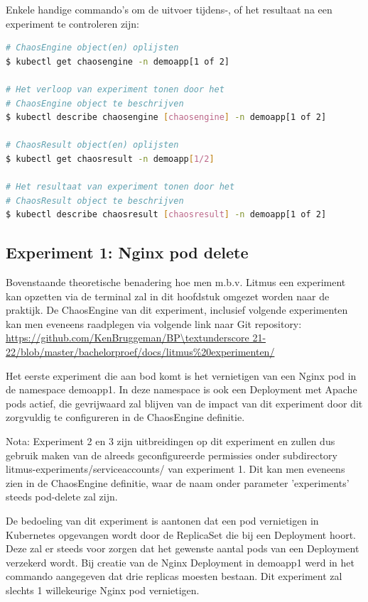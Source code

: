 Enkele handige commando's om de uitvoer tijdens-, of het resultaat na een experiment te controleren zijn:
\begin{lstlisting}[language=bash]
# ChaosEngine object(en) oplijsten
$ kubectl get chaosengine -n demoapp[1 of 2]

# Het verloop van experiment tonen door het 
# ChaosEngine object te beschrijven
$ kubectl describe chaosengine [chaosengine] -n demoapp[1 of 2]

# ChaosResult object(en) oplijsten
$ kubectl get chaosresult -n demoapp[1/2]

# Het resultaat van experiment tonen door het 
# ChaosResult object te beschrijven
$ kubectl describe chaosresult [chaosresult] -n demoapp[1 of 2]
\end{lstlisting}

\subsection{Experiment 1: Nginx pod delete}

Bovenstaande theoretische benadering hoe men m.b.v. Litmus een experiment kan opzetten via de terminal zal in dit hoofdstuk omgezet worden naar de praktijk. De ChaosEngine van dit experiment, inclusief volgende experimenten kan men eveneens raadplegen via volgende link naar Git repository: \url{https://github.com/KenBruggeman/BP\textunderscore 21-22/blob/master/bachelorproef/docs/litmus%20experimenten/}

Het eerste experiment die aan bod komt is het vernietigen van een Nginx pod in de namespace demoapp1. In deze namespace is ook een Deployment met Apache pods actief, die gevrijwaard zal blijven van de impact van dit experiment door dit zorgvuldig te configureren in de ChaosEngine definitie. 

Nota: Experiment 2 en 3 zijn uitbreidingen op dit experiment en zullen dus gebruik maken van de alreeds geconfigureerde permissies onder subdirectory litmus-experiments/serviceaccounts/ van experiment 1. Dit kan men eveneens zien in de ChaosEngine definitie, waar de naam onder parameter 'experiments' steeds pod-delete zal zijn. 

De bedoeling van dit experiment is aantonen dat een pod vernietigen in Kubernetes opgevangen wordt door de ReplicaSet die bij een Deployment hoort. Deze zal er steeds voor zorgen dat het gewenste aantal pods van een Deployment verzekerd wordt. Bij creatie van de Nginx Deployment in demoapp1 werd in het commando aangegeven dat drie replicas moesten bestaan. Dit experiment zal slechts 1 willekeurige Nginx pod vernietigen.  

